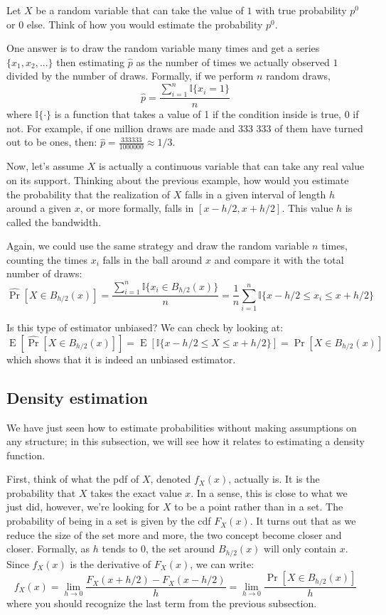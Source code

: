 \documentclass[12pt]{report}
\newcommand{\E}[1]{\operatorname{E}\left[#1\right]}
\newcommand{\Prob}[1]{\operatorname{Pr}\left[#1\right]}
\newcommand{\Probhat}[1]{\hat{\operatorname{Pr}}\left[#1\right]}
\begin{document}
Let $X$ be a random variable that can take the value of $1$ with true probability $p^0$ or $0$ else. Think of how you would estimate the probability $p^0$.

One answer is to draw the random variable many times and get a series $\{ x_1, x_2, ...\}$ then estimating $\hat p$ as the number of times we actually observed $1$ divided by the number of draws. Formally, if we perform $n$ random draws, $$\hat p = \frac{\sum_{i=1}^{n} \mathbb{I}\{x_i = 1\} }{n} $$ where $\mathbb{I}\{\cdot\}$ is a function that takes a value of 1 if the condition inside is true, 0 if not. For example, if one million draws are made and 333 333 of them have turned out to be ones, then: $\hat p = \frac{ 333333 }{1000000}\approx 1/3 $.

Now, let's assume $X$ is actually a continuous variable that can take any real value on its support. Thinking about the previous example, how would you estimate the probability that the realization of $X$ falls in a given interval of length $h$ around a given $x$, or more formally, falls in $[x - h/2, x+ h/2]$. This value $h$ is called the bandwidth.

Again, we could use the same strategy and draw the random variable $n$ times, counting the times $x_i$ falls in the ball around $x$ and compare it with the total number of draws: $$ \Probhat{ X\in B_{h/2}(x) } = \frac{\sum_{i=1}^{n} \mathbb{I}\{ x_i \in B_{h/2}(x)\} }{n} = \frac{1}{n} \sum_{i=1}^{n} \mathbb{I}\{ x - h/2 \leq x_i \leq x + h/2 \} $$

Is this type of estimator unbiased? We can check by looking at: $$\E{\Probhat{ X\in B_{h/2}(x) }} = \E{\mathbb{I}\{ x - h/2 \leq X \leq x + h/2 \}} = \Prob{X\in B_{h/2}(x)} $$ which shows that it is indeed an unbiased estimator. 

\subsection{Density estimation}

We have just seen how to estimate probabilities without making assumptions on any structure; in this subsection, we will see how it relates to estimating a density function.

First, think of what the pdf of $X$, denoted $f_X(x)$, actually is. It is the probability that $X$ takes the exact value $x$. In a sense, this is close to what we just did, however, we're looking for $X$ to be a point rather than in a set. The probability of being in a set is given by the cdf $F_X(x)$. It turns out that as we reduce the size of the set more and more, the two concept become closer and closer. Formally, as $h$ tends to 0, the set around $B_{h/2}(x)$ will only contain $x$. Since $f_X(x)$ is the derivative of $F_X(x)$, we can write: $$f_X(x) = \lim_{h\to 0} \frac{F_X(x+h/2) - F_X(x-h/2)}{h} = \lim_{h\to 0} \frac{\Prob{X\in B_{h/2}(x)}}{h} $$ where you should recognize the last term from the previous subsection.
\end{document}
